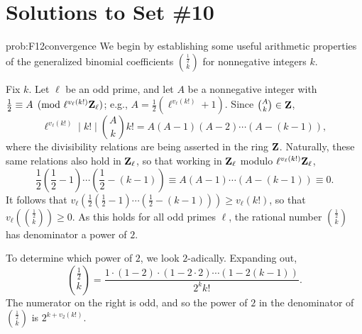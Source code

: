 \chapter*{Solutions to Set \#10}
\label{set9sols}

\begin{sol}{prob:F12convergence} 
We begin by establishing some useful arithmetic properties of the generalized binomial coefficients $\binom{\frac{1}{2}}{k}$ for nonnegative integers $k$.

Fix $k$. Let $\ell$ be an odd prime, and let $A$ be a nonnegative integer with $\frac{1}{2} \equiv A \pmod{\ell^{v_\ell(k!)}\mathbf{Z}_\ell}$; e.g., $A =\frac{1}{2} (\ell^{v_\ell(k!)}+1)$. Since $\binom{A}{k} \in \mathbf{Z}$,
\[ \ell^{v_\ell(k!)} \mid k! \mid \binom{A}{k} k! = A(A-1)(A-2) \cdots (A-(k-1)), \]
where the divisibility relations are being asserted in the ring $\mathbf{Z}$. Naturally, these same relations also hold in $\mathbf{Z}_{\ell}$, so that working in $\mathbf{Z}_{\ell}$ modulo $\ell^{v_\ell(k!)}\mathbf{Z}_{\ell}$,
\[ \frac{1}{2}\left(\frac{1}{2}-1\right) \cdots \left(\frac{1}{2}-(k-1)\right) \equiv A(A-1)\cdots (A-(k-1)) \equiv 0. \]
It follows that $v_\ell(\frac{1}{2}(\frac{1}{2}-1) \cdots (\frac{1}{2}-(k-1))) \ge v_\ell(k!)$, so that $v_\ell(\binom{\frac{1}{2}}{k})  \ge 0$. %
As this holds for all odd primes $\ell$, the rational number $\binom{\frac{1}{2}}{k}$ has denominator a power of $2$.

To determine which power of $2$, we look $2$-adically. Expanding out, $$\binom{\frac{1}{2}}{k} = \frac{1\cdot (1-2)\cdot (1-2\cdot 2) \cdots (1-2(k-1))}{2^k k!}.$$  
The numerator on the right is odd, and so the power of $2$ in the denominator of $\binom{\frac{1}{2}}{k}$ is $2^{k+v_2(k!)}$. 


\end{sol}
